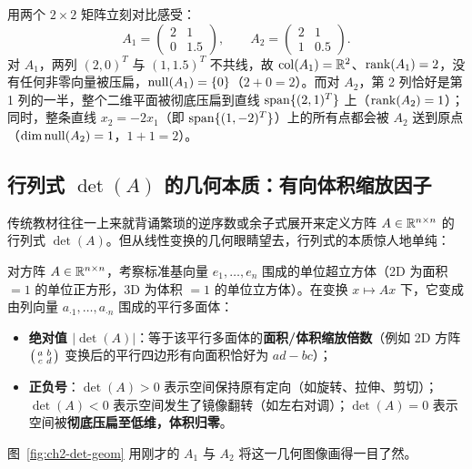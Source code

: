 用两个 $2 \times 2$ 矩阵立刻对比感受：
\[
  A_1 = \begin{pmatrix} 2 & 1 \\ 0 & 1.5 \end{pmatrix}, \qquad
  A_2 = \begin{pmatrix} 2 & 1 \\ 1 & 0.5 \end{pmatrix}.
\]
对 $A_1$，两列 $(2,0)^T$ 与 $(1,1.5)^T$ 不共线，故 $\operatorname{col}(A_1) = \mathbb{R}^2$、$\operatorname{rank}(A_1) = 2$，没有任何非零向量被压扁，$\operatorname{null}(A_1) = \{0\}$（$2 + 0 = 2$）。而对 $A_2$，第 2 列恰好是第 1 列的一半，整个二维平面被彻底压扁到直线 $\operatorname{span}\{(2, 1)^T\}$ 上（$\operatorname{rank}(A_2) = 1$）；同时，整条直线 $x_2 = -2x_1$（即 $\operatorname{span}\{(1, -2)^T\}$）上的所有点都会被 $A_2$ 送到原点（$\dim\operatorname{null}(A_2) = 1$，$1 + 1 = 2$）。

\subsection{行列式 $\det(A)$ 的几何本质：有向体积缩放因子}

传统教材往往一上来就背诵繁琐的逆序数或余子式展开来定义方阵 $A \in \mathbb{R}^{n \times n}$ 的行列式 $\det(A)$。但从线性变换的几何眼睛望去，行列式的本质惊人地单纯：

\begin{defBox}
\begin{definition}[行列式的几何意义]\label{def:det-geom}
对方阵 $A \in \mathbb{R}^{n \times n}$，考察标准基向量 $e_1, \dots, e_n$ 围成的单位超立方体（2D 为面积 $=1$ 的单位正方形，3D 为体积 $=1$ 的单位立方体）。在变换 $x \mapsto Ax$ 下，它变成由列向量 $a_{\cdot 1}, \dots, a_{\cdot n}$ 围成的平行多面体：
\begin{itemize}
  \item \textbf{绝对值 $|\det(A)|$}：等于该平行多面体的\textbf{面积/体积缩放倍数}（例如 2D 方阵 $\begin{psmallmatrix}a & b \\ c & d\end{psmallmatrix}$ 变换后的平行四边形有向面积恰好为 $ad - bc$）；
  \item \textbf{正负号}：$\det(A) > 0$ 表示空间保持原有定向（如旋转、拉伸、剪切）；$\det(A) < 0$ 表示空间发生了镜像翻转（如左右对调）；$\det(A) = 0$ 表示空间被\textbf{彻底压扁至低维，体积归零}。
\end{itemize}
\end{definition}
\end{defBox}

图~\ref{fig:ch2-det-geom} 用刚才的 $A_1$ 与 $A_2$ 将这一几何图像画得一目了然。

